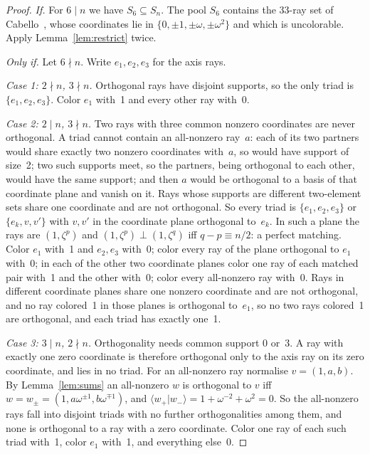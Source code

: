 \documentclass[11pt,a4paper]{article}
\theoremstyle{remark}
\newcommand{\braket}[2]{\langle#1|#2\rangle}
\begin{document}
\begin{proof}
\emph{If.}  For $6\mid n$ we have $S_6\subseteq S_n$.  The pool $S_6$ contains the 33-ray set of
Cabello~\cite{Cabello2025simplest}, whose coordinates lie in $\{0,\pm1,\pm\omega,\pm\omega^2\}$
and which is uncolorable.  Apply Lemma~\ref{lem:restrict} twice.

\emph{Only if.}  Let $6\nmid n$.  Write $e_1,e_2,e_3$ for the axis rays.

\emph{Case 1: $2\nmid n$, $3\nmid n$.}  Orthogonal rays have disjoint supports, so the only triad
is $\{e_1,e_2,e_3\}$.  Color $e_1$ with~1 and every other ray with~0.

\emph{Case 2: $2\mid n$, $3\nmid n$.}  Two rays with three common nonzero coordinates are never
orthogonal.  A triad cannot contain an all-nonzero ray~$a$: each of its two partners would share exactly two
nonzero coordinates with~$a$, so would have support of size~2; two such supports meet, so the
partners, being orthogonal to each other, would have the same support; and then $a$ would be
orthogonal to a basis of that coordinate plane and vanish on it.  Rays whose supports are
different two-element sets share one coordinate and are not orthogonal.  So every triad is $\{e_1,e_2,e_3\}$ or $\{e_k,v,v'\}$ with $v,v'$ in the coordinate plane
orthogonal to~$e_k$.  In such a plane the rays are $(1,\zeta^p)$ and $(1,\zeta^p)\perp(1,\zeta^q)$
iff $q-p\equiv n/2$: a perfect matching.  Color $e_1$ with~1 and $e_2,e_3$ with~0; color every
ray of the plane orthogonal to $e_1$ with~0; in each of the other two coordinate planes color one
ray of each matched pair with~1 and the other with~0; color every all-nonzero ray with~0.  Rays in
different coordinate planes share one nonzero coordinate and are not orthogonal, and no ray
colored~1 in those planes is orthogonal to~$e_1$, so no two rays colored~1 are orthogonal, and
each triad has exactly one~1.

\emph{Case 3: $3\mid n$, $2\nmid n$.}  Orthogonality needs common support 0 or~3.  A ray with
exactly one zero coordinate is therefore orthogonal only to the axis ray on its zero coordinate,
and lies in no triad.  For an all-nonzero ray normalise $v=(1,a,b)$.  By Lemma~\ref{lem:sums} an
all-nonzero $w$ is orthogonal to $v$ iff $w=w_{\pm}=(1,a\omega^{\pm1},b\omega^{\mp1})$, and
$\braket{w_+}{w_-}=1+\omega^{-2}+\omega^{2}=0$.  So the all-nonzero rays fall into disjoint triads
with no further orthogonalities among them, and none is orthogonal to a ray with a zero
coordinate.  Color one ray of each such triad with~1, color $e_1$ with~1, and everything else~0.
\end{proof}
\end{document}
